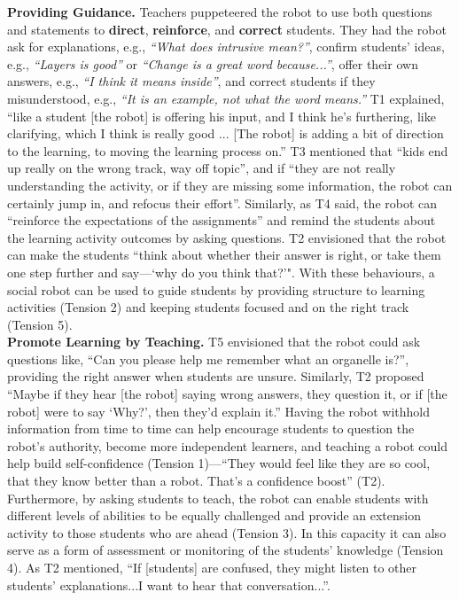 \textbf{Providing Guidance.} Teachers puppeteered the robot to use both questions and statements to \textbf{direct}, \textbf{reinforce}, and \textbf{correct} students. They had the robot ask for explanations, e.g., \textit{``What does intrusive mean?''}, confirm students' ideas, e.g., \textit{``Layers is good''} or \textit{``Change is a great word because...''}, offer their own answers, e.g., \textit{``I think it means inside''}, and correct students if they misunderstood, e.g., \textit{``It is an example, not what the word means.''} T1 explained, ``like a student [the robot] is offering his input, and I think he's furthering, like clarifying, which I think is really good ... [The robot] is adding a bit of direction to the learning, to moving the learning process on.'' T3 mentioned that ``kids end up really on the wrong track, way off topic'', and if ``they are not really understanding the activity, or if they are missing some information, the robot can certainly jump in, and refocus their effort''. Similarly, as T4 said, the robot can ``reinforce the expectations of the assignments'' and remind the students about the learning activity outcomes by asking questions.
T2 envisioned that the robot can make the students ``think about whether their answer is right, or take them one step further and say---`why do you think that?'". With these behaviours, a social robot can be used to guide students by providing structure to learning activities (Tension 2) and keeping students focused and on the right track (Tension 5).\\

\textbf{Promote Learning by Teaching.} T5 envisioned that the robot could ask questions like, ``Can you please help me remember what an organelle is?'', providing the right answer when students are unsure. Similarly, T2 proposed ``Maybe if they hear [the robot] saying wrong answers, they question it, or if [the robot] were to say `Why?', then they'd explain it.'' Having the robot withhold information from time to time can help encourage students to question the robot's authority, become more independent learners, and teaching a robot could help build self-confidence (Tension 1)---``They would feel like they are so cool, that they know better than a robot.  That's a confidence boost'' (T2). Furthermore, by asking students to teach, the robot can enable students with different levels of abilities to be equally challenged and provide an extension activity to those students who are ahead (Tension 3). In this capacity it can also serve as a form of assessment or monitoring of the students' knowledge (Tension 4). As T2 mentioned,  ``If [students] are confused, they might listen to other students' explanations...I want to hear that conversation...''. 

